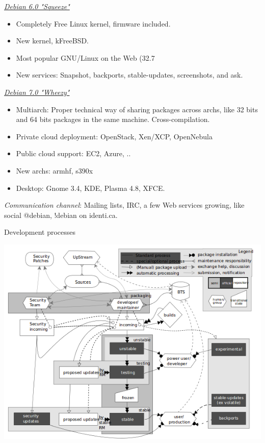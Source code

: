 \documentclass[11pt]{article}
\begin{document}
\underline{\emph{Debian 6.0 "Squeeze"}}
\begin{itemize}
	\item Completely Free Linux kernel, firmware included.
	\item New kernel, kFreeBSD.
	\item Most popular GNU/Linux on the Web (32.7%
	\item New services: Snapshot, backports, stable-updates, screenshots, and ask.
\end{itemize}

\underline{\emph{Debian 7.0  "Wheezy"}}
\begin{itemize}
	\item Multiarch: 	Proper technical way of sharing packages across archs, like 32 bits and 64 bits packages in the same machine. Cross-compilation.
	\item Private cloud deployment:  OpenStack, Xen/XCP, OpenNebula
	\item Public cloud support: EC2, Azure, ..
	\item New archs: armhf, s390x
	\item Desktop: Gnome 3.4, KDE, Plasma 4.8, XFCE.
\end{itemize}

\emph{Communication channel}: Mailing lists, IRC, a few Web services growing, like social @debian, !debian on identi.ca.

Development processes

\hfill\includegraphics[scale=0.6]{img/DebianDevelopmentProcess}\hspace*{\fill}
	
\end{document}
